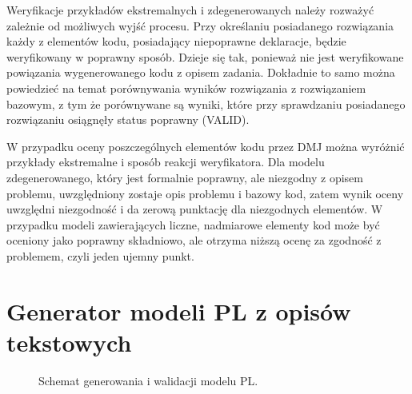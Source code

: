 Weryfikacje przykładów ekstremalnych i zdegenerowanych należy rozważyć zależnie od możliwych wyjść procesu. Przy określaniu posiadanego rozwiązania każdy z elementów kodu, posiadający niepoprawne deklaracje, będzie weryfikowany w poprawny sposób. Dzieje się tak, ponieważ nie jest weryfikowane powiązania wygenerowanego kodu z opisem zadania. Dokładnie to samo można powiedzieć na temat porównywania wyników rozwiązania z rozwiązaniem bazowym, z tym że porównywane są wyniki, które przy sprawdzaniu posiadanego rozwiązaniu osiągnęły status poprawny (VALID).

W przypadku oceny poszczególnych elementów kodu przez DMJ można wyróżnić przykłady ekstremalne i sposób reakcji weryfikatora. Dla modelu zdegenerowanego, który jest formalnie poprawny, ale niezgodny z opisem problemu, uwzględniony zostaje opis problemu i bazowy kod, zatem wynik oceny uwzględni niezgodność i da zerową punktację dla niezgodnych elementów. W przypadku modeli zawierających liczne, nadmiarowe elementy kod może być oceniony jako poprawny składniowo, ale otrzyma niższą ocenę za zgodność z problemem, czyli jeden ujemny punkt.

\section{Generator modeli PL z opisów tekstowych}

\begin{figure}[H]
    \centering

\caption{Schemat generowania i walidacji modelu PL.}
\label{fig:workflow}
\end{figure}


